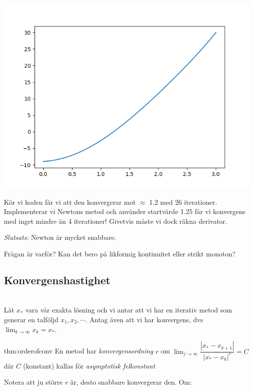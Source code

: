 \begin{center}
  \includegraphics{figures/Figure_1.png}
\end{center}

\pagebreak
\noindent Kör vi koden får vi att den konvergerar mot $\approx$ 1.2 med 26 iterationer. Implementerar vi Newtons metod och använder startvärde 1.25 får vi konvergens med inget mindre än 4 iterationer! Givetvis måste vi dock räkna derivator. 
\par\bigskip
\noindent \textit{Slutsats:} Newton är mycket snabbare.\par\noindent Frågan är varför? Kan det bero på likformig kontinuitet eller strikt monoton?
\par\bigskip

\subsection{Konvergenshastighet}\hfill\\

\noindent Låt $x_*$ vara vår exakta lösning och vi antar att vi har en iterativ metod som generar en talföljd $x_1, x_2, \cdots$. Antag även att vi har konvergens, dvs $\lim_{k\to\infty}x_k = x_*$.
\par\bigskip
\begin{theo}[Konvergensordning]{thm:orderofconv}
  En metod har \textit{konvergensordning} $r$ om $\lim_{j\to\infty}\dfrac{\left|x_*-x_{k+1}\right|}{\left|x_*-x_k\right|^r} = C$ där $C$ (konstant) kallas för \textit{asymptotisk felkonstant} 
\end{theo}
\par\bigskip
\noindent Notera att ju större $r$ är, desto snabbare konvergerar den. Om:

